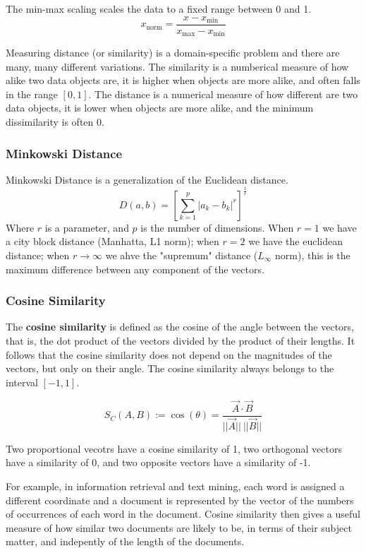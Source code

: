 The min-max scaling scales the data to a fixed range between 0 and 1.
\begin{equation*}
    x_\text{norm} = \frac {x-x_\text{min}} {x_\text{max} - x_\text{min}}
\end{equation*}

Measuring distance (or similarity) is a domain-specific problem and there are many, many different variations. The similarity is a numberical measure of how alike two data objects are, it is higher when objects are more alike, and often falls in the range \([0,1]\). The distance is a numerical measure of how different are two data objects, it is lower when objects are more alike, and the minimum dissimilarity is often 0.

\subsubsection{Minkowski Distance}
Minkowski Distance is a generalization of the Euclidean distance.
\begin{equation}
    D(a,b) = \left[ \sum_{k=1}^p |a_k - b_k|^r \right]^{\frac 1 r}
\end{equation}
Where \(r\) is a parameter, and \(p\) is the number of dimensions. When \(r=1\) we have a city block distance (Manhatta, L1 norm); when \(r=2\) we have the euclidean distance; when \(r \to \infty\) we ahve the "supremum" distance (\(L_\infty\) norm), this is the maximum difference between any component of the vectors.

\subsubsection{Cosine Similarity}
The \textbf{cosine similarity} is defined as the cosine of the angle between the vectors, that is, the dot product of the vectors divided by the product of their lengths. It follows that the cosine similarity does not depend on the magnitudes of the vectors, but only on their angle. The cosine similarity always belongs to the interval \([-1,1]\).

\begin{equation}
S_C(A,B) := \cos(\theta) = \frac {\vec{A} \cdot \vec{B}} {||\vec{A}||\ ||\vec{B}||}
\end{equation}

Two proportional vecotrs have a cosine similarity of 1, two orthogonal vectors have a similarity of 0, and two opposite vectors have a similarity of -1.

For example, in information retrieval and text mining, each word is assigned a different coordinate and a document is represented by the vector of the numbers of occurrences of each word in the document. Cosine similarity then gives a useful measure of how similar two documents are likely to be, in terms of their subject matter, and indepently of the length of the documents.

